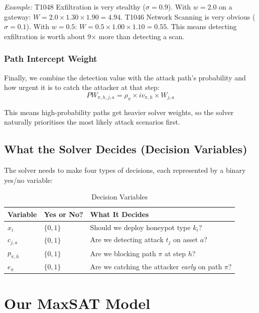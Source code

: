 \documentclass[journal]{IEEEtran}
\begin{document}
\textit{Example:} T1048 Exfiltration is very stealthy
($\sigma=0.9$). With $w=2.0$ on a gateway:
$W = 2.0\times1.30\times1.90 = 4.94$.
T1046 Network Scanning is very obvious ($\sigma=0.1$).
With $w=0.5$: $W = 0.5\times1.00\times1.10 = 0.55$.
This means detecting exfiltration is worth about 9$\times$ more
than detecting a scan.

\subsubsection{Path Intercept Weight}
Finally, we combine the detection value with the attack path's
probability and how urgent it is to catch the attacker at that
step:
\begin{equation}
  PW_{\pi,h,j,a} = \rho_\pi \times iv_{\pi,h} \times W_{j,a}
\end{equation}

This means high-probability paths get heavier solver weights,
so the solver naturally prioritises the most likely attack
scenarios first.

\subsection{What the Solver Decides (Decision Variables)}

The solver needs to make four types of decisions, each
represented by a binary yes/no variable:

\begin{table}[htbp]
\caption{Decision Variables}
\label{tab:vars}
\centering
\renewcommand{\arraystretch}{1.2}
\begin{tabular}{@{}lll@{}}
\toprule
\textbf{Variable} & \textbf{Yes or No?} & \textbf{What It Decides} \\
\midrule
$x_i$      & $\{0,1\}$ & Should we deploy honeypot type $k_i$? \\
$c_{j,a}$  & $\{0,1\}$ & Are we detecting attack $t_j$ on asset $a$? \\
$p_{\pi,h}$& $\{0,1\}$ & Are we blocking path $\pi$ at step $h$? \\
$e_\pi$    & $\{0,1\}$ & Are we catching the attacker \emph{early} on path $\pi$? \\
\bottomrule
\end{tabular}
\end{table}

\section{Our MaxSAT Model}
\label{sec:formulation}
\end{document}
